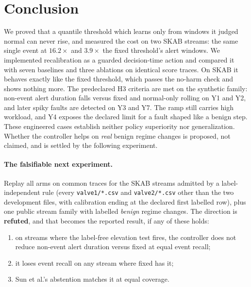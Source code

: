 \section{Conclusion}\label{sec:conclusion}

We proved that a quantile threshold which learns only from windows it judged normal can
never rise, and measured the cost on two SKAB streams: the same single event at
$16.2\times$ and $3.9\times$ the fixed threshold's alert windows. We implemented
recalibration as a guarded decision-time action and compared it with seven baselines
and three ablations on identical score traces. On SKAB it behaves exactly like the fixed
threshold, which passes the no-harm check and shows nothing more. The predeclared H3
criteria are met on the synthetic family: non-event alert duration falls versus fixed
and normal-only rolling on Y1 and Y2, and later spiky faults are detected on Y3 and Y7.
The ramp still carries high workload, and Y4 exposes the declared limit for a fault
shaped like a benign step. These engineered cases establish neither policy superiority
nor generalization. Whether the controller helps on
\emph{real} benign regime changes is proposed, not claimed, and is settled by the
following experiment.

\pagebreak
\paragraph{The falsifiable next experiment.}\Sproposed{}
Replay all arms on common traces for the SKAB streams admitted by a label-independent
rule (every \texttt{valve1/*.csv} and \texttt{valve2/*.csv} other than the two
development files, with calibration ending at the declared first labelled row), plus one
public stream family with labelled \emph{benign} regime changes. The direction is
\textbf{refuted}, and that becomes the reported result, if any of these holds:
\begin{enumerate}[label=(\alph*), leftmargin=2em, itemsep=1pt, topsep=2pt]
  \item on streams where the label-free elevation test fires, the controller does not
    reduce non-event alert duration versus fixed at equal event recall;
  \item it loses event recall on any stream where fixed has it;
  \item Sun et al.'s abstention matches it at equal coverage.
\end{enumerate}
